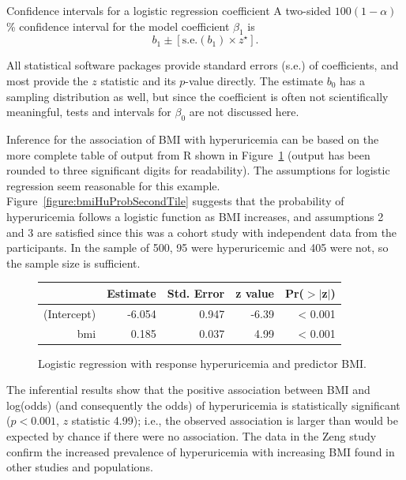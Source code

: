 \begin{onebox}{Confidence intervals for a logistic regression coefficient}
A two-sided $100(1 - \alpha)$\% confidence interval for the model coefficient $\beta_1$ is
\[
  b_1 \pm [{\textrm{s.e.}(b_1)} \times z^\star].
\]
\end{onebox}

All statistical software packages provide standard errors (s.e.) of coefficients, and most provide the $z$ statistic and its $p$-value directly.  The estimate $b_0$ has a sampling distribution as well, but since the coefficient is often not scientifically meaningful, tests and intervals for $\beta_0$ are not discussed here.

Inference for the association of BMI with hyperuricemia can be based on the more complete table of output from \textsf{R} shown in Figure~\ref{figure:bmiHyperuricemiaLogReg} (output has been rounded to three significant digits for readability).  The assumptions for logistic regression seem reasonable for this example. Figure~\ref{figure:bmiHuProbSecondTile} suggests that the probability of hyperuricemia follows a logistic function as BMI increases, and assumptions 2 and 3 are satisfied since this was a cohort study with independent data from the participants. In the sample of 500, 95 were hyperuricemic and 405 were not, so the sample size is sufficient.

\begin{figure}[ht]
\centering
\begin{tabular}{rrrrr}
  \hline
 & Estimate & Std. Error & z value & Pr($>$$|$z$|$) \\
  \hline
(Intercept) & -6.054 & 0.947 & -6.39 & < 0.001 \\
  bmi & 0.185 & 0.037 & 4.99 & < 0.001 \\
   \hline
\end{tabular}
\caption{Logistic regression with response hyperuricemia
        and predictor BMI.}
\label{figure:bmiHyperuricemiaLogReg}
\end{figure}

The inferential results show that the positive association between BMI and log(odds) (and consequently the odds) of hyperuricemia is statistically significant ($p< 0.001$, $z$ statistic 4.99); i.e., the observed association is larger than would be expected by chance if there were no association.  The data in the Zeng study confirm the increased prevalence of hyperuricemia with increasing BMI found in other studies and populations.

